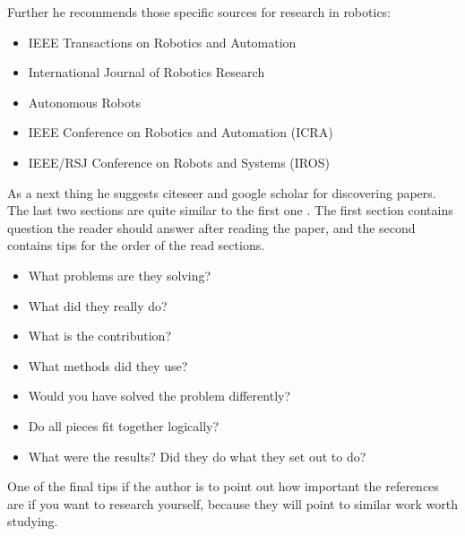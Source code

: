 \documentclass{article}
\begin{document}
Further he recommends those specific sources for research in robotics:  
\begin{itemize}
  \item IEEE Transactions on Robotics and Automation
  \item International Journal of Robotics Research
  \item Autonomous Robots
  \item IEEE Conference on Robotics and Automation (ICRA)
  \item IEEE/RSJ Conference on Robots and Systems (IROS)
\end{itemize}

As a next thing he suggests citeseer and google scholar for discovering papers. The last two sections are quite similar to the first one
\cite{Griswold2009}. The first section contains question the reader should answer after reading the paper, and the second contains
tips for the order of the read sections.
\begin{itemize}
  \item What problems are they solving?
  \item What did they really do?
  \item What is the contribution?
  \item What methods did they use? 
  \item Would you have solved the problem differently?
  \item Do all pieces fit together logically?
  \item What were the results? Did they do what they set out to do?
\end{itemize}
One of the final tips if the author is to point out how important the references are if you want to research yourself, because 
they will point to similar work worth studying.




\end{document}

